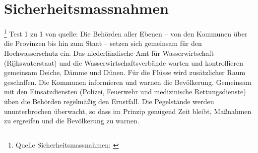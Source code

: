 \section{Sicherheitsmassnahmen}\footnote{Quelle Sicherheitsmassnahmen: \cite{risikokarte}}
Test 1 zu 1 von quelle:
\newline\newline
Die Behörden aller Ebenen – von den Kommunen über die Provinzen bis 
hin zum Staat – setzen sich gemeinsam für den Hochwasserschutz ein.
 Das niederländische Amt für Wasserwirtschaft (Rijkswaterstaat) und
  die Wasserwirtschaftsverbände warten und kontrollieren gemeinsam 
  Deiche, Dämme und Dünen. Für die Flüsse wird zusätzlicher Raum 
  geschaffen. Die Kommunen informieren und warnen die Bevölkerung.
   Gemeinsam mit den Einsatzdiensten (Polizei, Feuerwehr und 
   medizinische Rettungsdienste) üben die Behörden regelmäßig
    den Ernstfall. Die Pegelstände werden ununterbrochen überwacht, 
    so dass im Prinzip genügend Zeit bleibt, Maßnahmen zu ergreifen
     und die Bevölkerung zu warnen.    

 